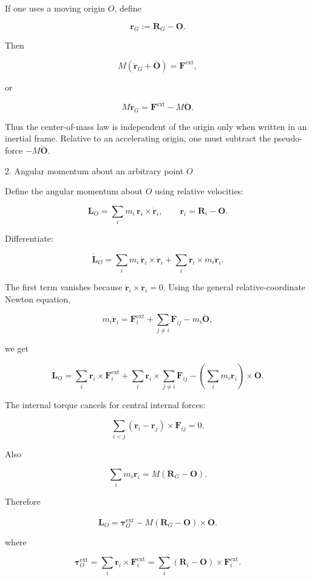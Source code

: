 \documentclass[a4paper,11pt]{article}
\begin{document}
If one uses a moving origin \(O\), define

\[
\mathbf r_G:=\mathbf R_G-\mathbf O.
\]

Then

\[
M\left(\ddot{\mathbf r}_G+\ddot{\mathbf O}\right)=\mathbf F^{\mathrm{ext}},
\]

or

\[
\boxed{
M\ddot{\mathbf r}_G=\mathbf F^{\mathrm{ext}}-M\ddot{\mathbf O}.
}
\]

Thus the center-of-mass law is independent of the origin only when written in an inertial frame. Relative to an accelerating origin, one must subtract the pseudo-force \(-M\ddot{\mathbf O}\).

\hrulefill

2. Angular momentum about an arbitrary point \(O\)

Define the angular momentum about \(O\) using relative velocities:

\[
\mathbf L_O
=
\sum_i m_i\,\mathbf r_i\times\dot{\mathbf r}_i,
\qquad
\mathbf r_i=\mathbf R_i-\mathbf O .
\]

Differentiate:

\[
\dot{\mathbf L}_O
=
\sum_i m_i\,\dot{\mathbf r}_i\times\dot{\mathbf r}_i
+
\sum_i \mathbf r_i\times m_i\ddot{\mathbf r}_i .
\]

The first term vanishes because \(\dot{\mathbf r}_i\times\dot{\mathbf r}_i=0\). Using the general relative-coordinate Newton equation,

\[
m_i\ddot{\mathbf r}_i
=
\mathbf F_i^{\mathrm{ext}}
+
\sum_{j\ne i}\mathbf F_{ij}
-
m_i\ddot{\mathbf O},
\]

we get

\[
\dot{\mathbf L}_O
=
\sum_i \mathbf r_i\times\mathbf F_i^{\mathrm{ext}}
+
\sum_i \mathbf r_i\times\sum_{j\ne i}\mathbf F_{ij}
-
\left(\sum_i m_i\mathbf r_i\right)\times\ddot{\mathbf O}.
\]

The internal torque cancels for central internal forces:

\[
\sum_{i<j}
(\mathbf r_i-\mathbf r_j)\times\mathbf F_{ij}=0.
\]

Also

\[
\sum_i m_i\mathbf r_i
=
M(\mathbf R_G-\mathbf O).
\]

Therefore

\[
\boxed{
\dot{\mathbf L}_O
=
\boldsymbol\tau_O^{\mathrm{ext}}
-
M(\mathbf R_G-\mathbf O)\times\ddot{\mathbf O}.
}
\]

where

\[
\boldsymbol\tau_O^{\mathrm{ext}}
=
\sum_i \mathbf r_i\times\mathbf F_i^{\mathrm{ext}}
=
\sum_i (\mathbf R_i-\mathbf O)\times\mathbf F_i^{\mathrm{ext}}.
\]
\end{document}
